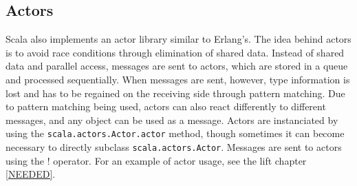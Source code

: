 \subsection{Actors}

Scala also implements an actor library similar to Erlang's. The idea behind actors is to avoid race conditions through elimination of shared data. Instead of shared data and parallel access, messages are sent to actors, which are stored in a queue and processed sequentially. When messages are sent, however, type information is lost and has to be regained on the receiving side through pattern matching. Due to pattern matching being used, actors can also react differently to different messages, and any object can be used as a message. Actors are instanciated by using the \lstinline!scala.actors.Actor.actor! method, though sometimes it can become necessary to directly subclass \lstinline!scala.actors.Actor!. Messages are sent to actors using the ! operator. For an example of actor usage, see the lift chapter \ref{NEEDED}.
